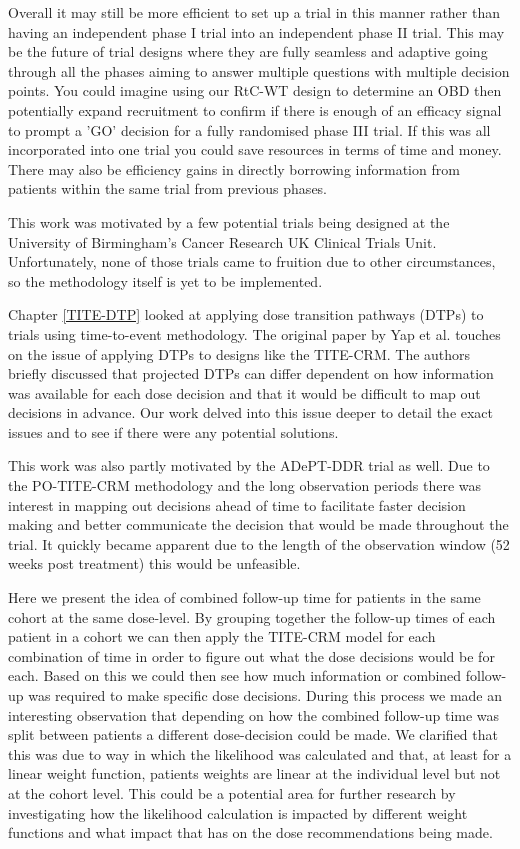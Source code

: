 Overall it may still be more efficient to set up a trial in this manner rather than having an independent phase \RN{1} trial into an independent phase \RN{2} trial. This may be the future of trial designs where they are fully seamless and adaptive going through all the phases aiming to answer multiple questions with multiple decision points. You could imagine using our RtC-WT design to determine an OBD then potentially expand recruitment to confirm if there is enough of an efficacy signal to prompt a 'GO' decision for a fully randomised phase \RN{3} trial. If this was all incorporated into one trial you could save resources in terms of time and money. There may also be efficiency gains in directly borrowing information from patients within the same trial from previous phases. 

This work was motivated by a few potential trials being designed at the University of Birmingham's Cancer Research UK Clinical Trials Unit. Unfortunately, none of those trials came to fruition due to other circumstances, so the methodology itself is yet to be implemented.  

Chapter \ref{TITE-DTP} looked at applying dose transition pathways (DTPs) to trials using time-to-event methodology. The original paper by Yap et al. \cite{yapDoseTransitionPathways2017} touches on the issue of applying DTPs to designs like the TITE-CRM. The authors briefly discussed that projected DTPs can differ dependent on how information was available for each dose decision and that it would be difficult to map out decisions in advance. Our work delved into this issue deeper to detail the exact issues and to see if there were any potential solutions.

This work was also partly motivated by the ADePT-DDR trial as well. Due to the PO-TITE-CRM methodology and the long observation periods there was interest in mapping out decisions ahead of time to facilitate faster decision making and better communicate the decision that would be made throughout the trial. It quickly became apparent due to the length of the observation window (52 weeks post treatment) this would be unfeasible. 

Here we present the idea of combined follow-up time for patients in the same cohort at the same dose-level. By grouping together the follow-up times of each patient in a cohort we can then apply the TITE-CRM model for each combination of time in order to figure out what the dose decisions would be for each. Based on this we could then see how much information or combined follow-up was required to make specific dose decisions. During this process we made an interesting observation that depending on how the combined follow-up time was split between patients a different dose-decision could be made. We clarified that this was due to way in which the likelihood was calculated and that, at least for a linear weight function, patients weights are linear at the individual level but not at the cohort level. This could be a potential area for further research by investigating how the likelihood calculation is impacted by different weight functions and what impact that has on the dose recommendations being made. 


